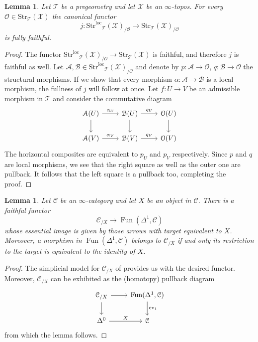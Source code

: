 \documentclass[12pt,a4paper,reqno]{amsart}
\theoremstyle{plain}
\newtheorem{lem}[thm]{Lemma}
\theoremstyle{definition}
\theoremstyle{remark}
\numberwithin{equation}{section}
\begin{document}
\begin{lem} \label{lem:strloc_fully_faitful_str}
	Let ${\mathcal T}$ be a pregeometry and let ${\mathcal X}$ be an $\infty$-topos.
	For every ${\mathcal O} \in {\mathrm{Str}}_{\mathcal T}({\mathcal X})$ the canonical functor
	\[ j \colon {\mathrm{Str}^\mathrm{loc}}_{\mathcal T}({\mathcal X})_{/{\mathcal O}} \to {\mathrm{Str}}_{\mathcal T}({\mathcal X})_{/{\mathcal O}} \]
	is fully faithful.
\end{lem}

\begin{proof}
	The functor ${\mathrm{Str}^\mathrm{loc}}_{\mathcal T}({\mathcal X})_{/{\mathcal O}} \to {\mathrm{Str}}_{\mathcal T}({\mathcal X})$ is faithful, and therefore $j$ is faithful as well. Let ${\mathcal A}, {\mathcal B} \in {\mathrm{Str}^\mathrm{loc}}_{\mathcal T}({\mathcal X})_{/{\mathcal O}}$ and denote by $p \colon {\mathcal A} \to {\mathcal O}$, $q \colon {\mathcal B} \to {\mathcal O}$ the structural morphisms.
	If we show that every morphism $\alpha \colon {\mathcal A} \to {\mathcal B}$ is a local morphism, the fullness of $j$ will follow at once.
	Let $f \colon U \to V$ be an admissible morphism in ${\mathcal T}$ and consider the commutative diagram
	\[ \begin{tikzcd}
	{\mathcal A}(U) \arrow{r}{\alpha_U} \arrow{d} & {\mathcal B}(U) \arrow{r}{q_U} \arrow{d} & {\mathcal O}(U) \arrow{d} \\
	{\mathcal A}(V) \arrow{r}{\alpha_V} & {\mathcal B}(V) \arrow{r}{q_V} & {\mathcal O}(V)
	\end{tikzcd} \]
	The horizontal composites are equivalent to $p_U$ and $p_V$ respectively.
	Since $p$ and $q$ are local morphisms, we see that the right square as well as the outer one are pullback.
	It follows that the left square is a pullback too, completing the proof.
\end{proof}

\begin{lem} \label{lem:slice_category_faithful}
	Let ${\mathcal C}$ be an $\infty$-category and let $X$ be an object in ${\mathcal C}$.
	There is a faithful functor
	\[ {\mathcal C}_{/X} \to \operatorname{Fun}(\Delta^1, {\mathcal C}) \]
	whose essential image is given by those arrows with target equivalent to $X$.
	Moreover, a morphism in $\operatorname{Fun}(\Delta^1 , {\mathcal C})$ belongs to ${\mathcal C}_{/X}$ if and only its restriction to the target is equivalent to the identity of $X$.
\end{lem}

\begin{proof}
	The simplicial model for ${\mathcal C}_{/X}$ of \cite[1.2.9.2]{HTT} provides us with the desired functor.
	Moreover, ${\mathcal C}_{/X}$ can be exhibited as the (homotopy) pullback diagram
	\[ \begin{tikzcd}
		{\mathcal C}_{/X} \arrow{r} \arrow{d} & \operatorname{Fun}(\Delta^1, {\mathcal C}) \arrow{d}{\mathrm{ev}_1} \\
		\Delta^0 \arrow{r}{X} & {\mathcal C}
	\end{tikzcd} \]
	from which the lemma follows.
\end{proof}
\end{document}
